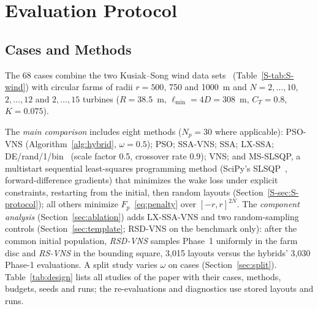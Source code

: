\section{Evaluation Protocol}
\label{sec:setup}

\subsection{Cases and Methods}
\label{sec:setup-cases}
The 68 cases combine the two Kusiak--Song wind data sets~\cite{Kusiak2010,Bansal2017} (Table~\ref{S-tab:S-wind}) with circular farms of radii $r=500$, 750 and 1000~m and $N=2,\ldots,10$, $2,\ldots,12$ and $2,\ldots,15$ turbines ($R=38.5$~m, $\ell_{\min}=4D=308$~m, $C_T=0.8$, $K=0.075$).

The \emph{main comparison} includes eight methods ($N_p=30$ where applicable): PSO-VNS (Algorithm~\ref{alg:hybrid}, $\omega=0.5$); PSO; SSA-VNS; SSA; LX-SSA; DE/rand/1/bin~\cite{Storn1997} (scale factor 0.5, crossover rate 0.9); VNS; and MS-SLSQP, a multistart sequential least-squares programming method (SciPy's SLSQP~\cite{Kraft1988}, forward-difference gradients) that minimizes the wake loss under explicit constraints, restarting from the initial, then random layouts (Section~\ref{S-sec:S-protocol}); all others minimize $F_p$~\eqref{eq:penalty} over $[-r,r]^{2N}$. The \emph{component analysis} (Section~\ref{sec:ablation}) adds LX-SSA-VNS and two random-sampling controls (Section~\ref{sec:template}; RSD-VNS on the benchmark only): after the common initial population, \emph{RSD-VNS} samples Phase~1 uniformly in the farm disc and \emph{RS-VNS} in the bounding square, 3,015 layouts versus the hybrids' 3,030 Phase-1 evaluations. A split study varies $\omega$ on \NSplitCases{} cases (Section~\ref{sec:split}). Table~\ref{tab:design} lists all studies of the paper with their cases, methods, budgets, seeds and runs; the re-evaluations and diagnostics use stored layouts and runs.

